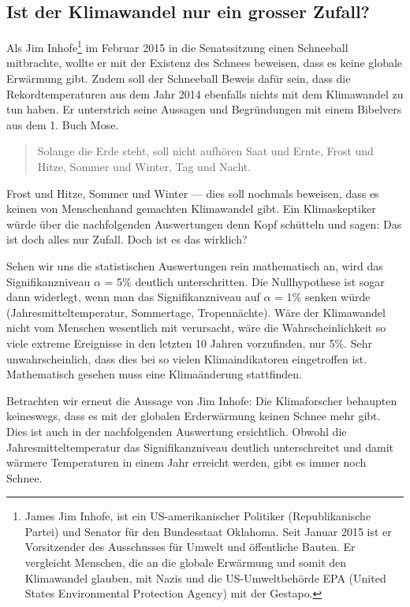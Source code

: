 \begin{refsection}
\section{Ist der Klimawandel nur ein grosser Zufall?}
Als Jim Inhofe\footnote{%
James \glqq Jim\grqq{} Inhofe, ist ein US-amerikanischer Politiker (Republikanische Partei) und Senator für den Bundesstaat Oklahoma. Seit Januar 2015 ist er Vorsitzender des Ausschusses für Umwelt und öffentliche Bauten. Er vergleicht Menschen, die an die globale Erwärmung und somit den Klimawandel glauben, mit Nazis und die US-Umweltbehörde EPA (United States Environmental Protection Agency) mit der Gestapo.} im Februar 2015 in die Senatssitzung einen Schneeball mitbrachte, wollte er mit der Existenz des Schnees beweisen, dass es keine globale Erwärmung gibt. Zudem soll der Schneeball Beweis dafür sein, dass die Rekordtemperaturen aus dem Jahr 2014 ebenfalls nichts mit dem Klimawandel zu tun haben. Er unterstrich seine Aussagen und Begründungen mit einem Bibelvers aus dem 1. Buch Mose.

\begin{quote} 
Solange die Erde steht, soll nicht aufhören Saat und Ernte, Frost und Hitze, Sommer und Winter, Tag und Nacht.
\end{quote}

Frost und Hitze, Sommer und Winter --- dies soll nochmals beweisen, dass es keinen von Menschenhand gemachten Klimawandel gibt.
Ein Klimaskeptiker würde über die nachfolgenden Auswertungen denn Kopf schütteln und sagen: Das ist doch alles nur Zufall. Doch ist es das wirklich?

Sehen wir uns die statistischen Auswertungen rein mathematisch an, wird das Signifikanzniveau $\alpha$ = 5\% deutlich unterschritten. Die Nullhypothese ist sogar dann widerlegt, wenn man das Signifikanzniveau auf $\alpha$ = 1\% senken würde (Jahresmitteltemperatur, Sommertage, Tropennächte). Wäre der Klimawandel nicht vom Menschen wesentlich mit verursacht, wäre die Wahrscheinlichkeit so viele extreme Ereignisse in den letzten 10 Jahren vorzufinden, nur 5\%. Sehr unwahrscheinlich, dass dies bei so vielen Klimaindikatoren eingetroffen ist. Mathematisch gesehen muss eine Klimaänderung stattfinden.

Betrachten wir erneut die Aussage von Jim Inhofe: Die Klimaforscher behaupten keineswegs, dass es mit der globalen Erderwärmung keinen Schnee mehr gibt. Dies ist auch in der nachfolgenden Auswertung ersichtlich. Obwohl die Jahresmitteltemperatur das Signifikanzniveau deutlich unterschreitet und damit wärmere Temperaturen in einem Jahr erreicht werden, gibt es immer noch Schnee. 


\end{refsection}
